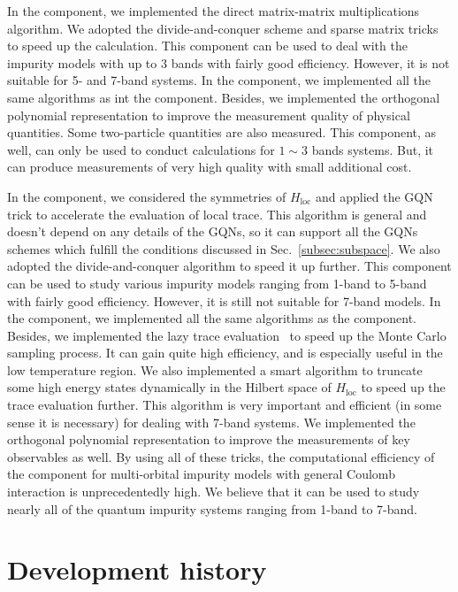 In the {\begonia} component, we implemented the direct matrix-matrix multiplications algorithm. We adopted the divide-and-conquer scheme and sparse matrix tricks to speed up the calculation. This component can be used to deal with the impurity models with up to $3$ bands with fairly good efficiency. However, it is not suitable for 5- and 7-band systems. In the {\lavender} component, we implemented all the same algorithms as int the {\begonia} component. Besides, we implemented the orthogonal polynomial representation to improve the measurement quality of physical quantities. Some two-particle quantities are also measured. This component, as well, can only be used to conduct calculations for $1 \sim 3$ bands systems. But, it can produce measurements of very high quality with small additional cost.

In the {\pansy} component, we considered the symmetries of $H_{\text{loc}}$ and applied the GQN trick to accelerate the evaluation of local trace. This algorithm is general and doesn't depend on any details of the GQNs, so it can support all the GQNs schemes which fulfill the conditions discussed in Sec.~\ref{subsec:subspace}. We also adopted the divide-and-conquer algorithm to speed it up further. This component can be used to study various impurity models ranging from 1-band to 5-band with fairly good efficiency. However, it is still not suitable for 7-band models. In the {\manjushaka} component, we implemented all the same algorithms as the {\pansy} component. Besides, we implemented the lazy trace evaluation~\cite{arXiv:1403.7214} to speed up the Monte Carlo sampling process. It can gain quite high efficiency, and is especially useful in the low temperature region. We also implemented a smart algorithm to truncate some high energy states dynamically in the Hilbert space of $H_{\text{loc}}$ to speed up the trace evaluation further. This algorithm is very important and efficient (in some sense it is necessary) for dealing with 7-band systems. We implemented the orthogonal polynomial representation to improve the measurements of key observables as well. By using all of these tricks, the computational efficiency of the {\manjushaka} component for multi-orbital impurity models with general Coulomb interaction is unprecedentedly high. We believe that it can be used to study nearly all of the quantum impurity systems ranging from 1-band to 7-band.

\section{Development history}


